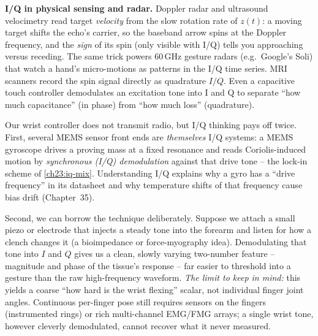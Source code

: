 \begin{applicationbox}
\textbf{I/Q in physical sensing and radar.} Doppler radar and ultrasound velocimetry read
target \emph{velocity} from the slow rotation rate of $z(t)$: a moving target shifts the
echo's carrier, so the baseband arrow spins at the Doppler frequency, and the
\emph{sign} of its spin (only visible with I/Q) tells you approaching versus receding.
The same trick powers $60\,$GHz gesture radars (e.g.\ Google's Soli) that watch a hand's
micro-motions as patterns in the I/Q time series. MRI scanners record the spin signal
directly as quadrature $I/Q$. Even a capacitive touch controller demodulates an
excitation tone into I and Q to separate ``how much capacitance'' (in phase) from
``how much loss'' (quadrature).
\end{applicationbox}

\begin{goalbox}
Our wrist controller does not transmit radio, but I/Q thinking pays off twice. First,
several MEMS sensor front ends are \emph{themselves} I/Q systems: a MEMS
gyroscope drives a proving mass at a fixed resonance and reads Coriolis-induced motion by
\emph{synchronous (I/Q) demodulation} against that drive tone -- the lock-in scheme
of \eqref{ch23:iq-mix}. Understanding I/Q explains why a gyro has a ``drive
frequency'' in its datasheet and why temperature shifts of that frequency cause bias
drift (Chapter~35).

Second, we can borrow the technique deliberately. Suppose we attach a small piezo or
electrode that injects a steady tone into the forearm and listen for how a clench changes
it (a bioimpedance or force-myography idea). Demodulating that tone into $I$ and $Q$
gives us a clean, slowly varying two-number feature -- magnitude and phase of the
tissue's response -- far easier to threshold into a gesture than the raw high-frequency
waveform. \emph{The limit to keep in mind:} this yields a coarse ``how hard is the wrist flexing''
scalar, not individual finger joint angles. Continuous per-finger pose still requires
sensors on the fingers (instrumented rings) or rich multi-channel EMG/FMG arrays; a
single wrist tone, however cleverly demodulated, cannot recover what it never measured.
\end{goalbox}

